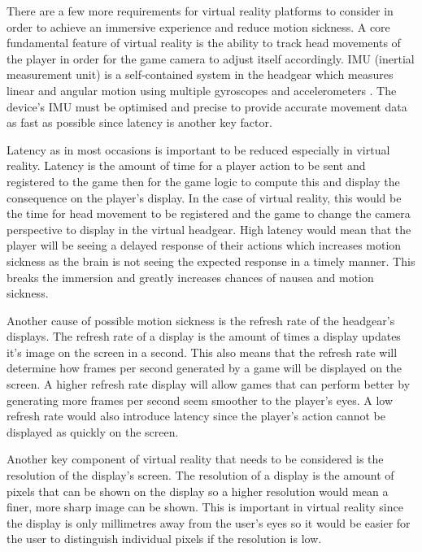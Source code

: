 There are a few more requirements for virtual reality platforms to consider in order to achieve an immersive experience and reduce motion sickness. A core fundamental feature of virtual reality is the ability to track head movements of the player in order for the game camera to adjust itself accordingly. IMU (inertial measurement unit) is a self-contained system in the headgear which measures linear and angular motion using multiple gyroscopes and accelerometers \cite{imu}. The device's IMU must be optimised and precise to provide accurate movement data as fast as possible since latency is another key factor.
\newline
\par
Latency as in most occasions is important to be reduced especially in virtual reality. Latency is the amount of time for a player action to be sent and registered to the game then for the game logic to compute this and display the consequence on the player's display. In the case of virtual reality, this would be the time for head movement to be registered and  the game to change the camera perspective to display in the virtual headgear. High latency would mean that the player will be seeing a delayed response of their actions which increases motion sickness as the brain is not seeing the expected response in a timely manner. This breaks the immersion and greatly increases chances of nausea and motion sickness.
\newline
\par
Another cause of possible motion sickness is the refresh rate of the headgear's displays. The refresh rate of a display is the amount of times a display updates it's image on the screen in a second. This also means that the refresh rate will determine how frames per second generated by a game will be displayed on the screen. A higher refresh rate display will allow games that can perform better by generating more frames per second seem smoother to the player's eyes. A low refresh rate would also introduce latency since the player's action cannot be displayed as quickly on the screen.
\newline
\par
Another key component of virtual reality that needs to be considered is the resolution of the display's screen. The resolution of a display is the amount of pixels that can be shown on the display so a higher resolution would mean a finer, more sharp image can be shown. This is important in virtual reality since the display is only millimetres away from the user's eyes so it would be easier for the user to distinguish individual pixels if the resolution is low.

